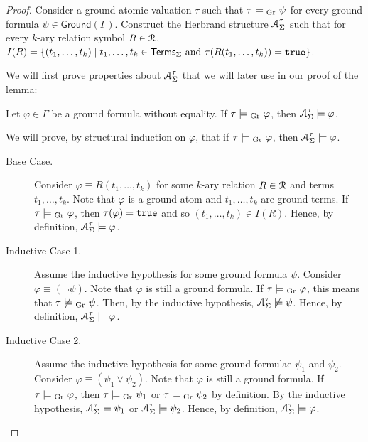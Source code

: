 \documentclass[11pt,usenames, dvipsnames]{article}
\begin{document}
\begin{proof}
  Consider a ground atomic valuation $\tau$ such that $\tau \models\textsubscript{Gr}\  \mathsf{\psi}$ for every ground formula $\psi \in \mathsf{Ground}(\Gamma)$. Construct the Herbrand structure $\struct_\Sigma^\tau$ such that for every $k$-ary relation symbol $R \in \reln$, $I(R) = \{(t_1, \ldots, t_k) \mid t_1, \ldots, t_k \in \mathsf{Terms}_\Sigma \text{ and } \tau(R(t_1, \ldots, t_k)) = \texttt{true}\}$.
  
  We will first prove properties about $\struct_\Sigma^\tau$ that we will later use in our proof of the lemma:
  \begin{claim}
    Let $\varphi \in \Gamma$ be a ground formula without equality. If $\tau \models\textsubscript{Gr}\  \varphi$, then $\struct_\Sigma^\tau \models \varphi$.
  \end{claim}

  \begin{subproof}[Subproof.]
    We will prove, by structural induction on $\varphi$, that if $\tau \models\textsubscript{Gr}\  \varphi$, then $\struct_\Sigma^\tau \models \varphi$.

    \begin{description}
      \item[Base Case.] Consider $\varphi \equiv R(t_1, \ldots, t_k)$ for some $k$-ary relation $R \in \reln$ and terms $t_1, \ldots, t_k$. Note that $\varphi$ is a ground atom and $t_1, \ldots, t_k$ are ground terms. If $\tau \models\textsubscript{Gr}\  \varphi$, then $\tau(\varphi) = \texttt{true}$ and so $(t_1, \ldots, t_k) \in I(R)$. Hence, by definition, $\struct_\Sigma^\tau \models \varphi$.

      \item[Inductive Case 1.] Assume the inductive hypothesis for some ground formula $\psi$. Consider $\varphi \equiv (\neg \psi)$. Note that $\varphi$ is still a ground formula. If $\tau \models\textsubscript{Gr}\  \varphi$, this means that $\tau \not\models\textsubscript{Gr}\  \psi$. Then, by the inductive hypothesis, $\struct_\Sigma^\tau \not\models \psi$. Hence, by definition, $\struct_\Sigma^\tau \models \varphi$. 
      
      \item[Inductive Case 2.] Assume the inductive hypothesis for some ground formulae $\psi_1$ and $\psi_2$. Consider $\varphi \equiv (\psi_1 \lor \psi_2)$. Note that $\varphi$ is still a ground formula. If $\tau \models\textsubscript{Gr}\  \varphi$, then $\tau \models\textsubscript{Gr}\  \psi_1$ or $\tau \models\textsubscript{Gr}\  \psi_2$ by definition. By the inductive hypothesis, $\struct_\Sigma^\tau \models \psi_1$ or $\struct_\Sigma^\tau \models \psi_2$. Hence, by definition, $\struct_\Sigma^\tau \models \varphi$.
    \end{description}


\end{subproof}
\end{proof}
\end{document}

